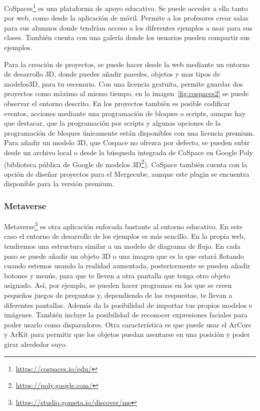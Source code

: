CoSpaces\footnote{\url{https://cospaces.io/edu/}} es una plataforma de apoyo educativo. Se puede acceder a ella tanto por web, como desde la aplicación de móvil. Permite a los profesores crear salas para sus alumnos donde tendrían acceso a los diferentes ejemplos a usar para sus clases. También cuenta con una galería donde los usuarios pueden compartir sus ejemplos.


Para la creación de proyectos, se puede hacer desde la web mediante un entorno de desarrollo 3D, donde puedes añadir paredes, objetos y mas tipos de modelos3D, para tu escenario. Con una licencia gratuita, permite guardar dos proyectos como máximo al mismo tiempo, en la imagen~\ref{fig:cospaces2} se puede observar el entorno descrito. En los proyectos también es posible codificar eventos, acciones mediante una programación de bloques o scripts, aunque hay que destacar, que la programación por scripts y algunas opciones de la programación de bloques únicamente están disponibles con una licencia premium. Para añadir un modelo 3D, que Cospace no ofrezca por defecto, se pueden subir desde un archivo local o desde la búsqueda integrada de CoSpace en Google Poly (biblioteca pública de Google de modelos 3D\footnote{\url{https://poly.google.com/}}).
CoSpace también cuenta con la opción de diseñar proyectos para el Mergecube, aunque este plugin se encuentra disponible para la versión premium.



\subsubsection{Metaverse} 

Metaverse\footnote{\url{https://studio.gometa.io/discover/me}} es otra aplicación enfocada bastante al entorno educativo. En este caso el entorno de desarrollo de los ejemplos es más sencillo. En la propia web, tendremos una estructura similar a un modelo de diagrama de flujo. En cada paso se puede añadir un objeto 3D o una imagen que es la que estará flotando cuando estemos usando la realidad aumentada, posteriormente se pueden añadir botones y menús, para que te lleven a otra pantalla que tenga otro objeto asignado. Así, por ejemplo, se pueden hacer programas en los que se creen pequeños juegos de preguntas y, dependiendo de las respuestas, te llevan a diferentes pantallas.
Además da la posibilidad de importar tus propios modelos e imágenes.
También incluye la posibilidad de reconocer expresiones faciales para poder usarlo como disparadores.
Otra característica es que puede usar el ArCore y ArKit para permitir que los objetos puedan asentarse en una posición y poder girar alrededor suyo.

